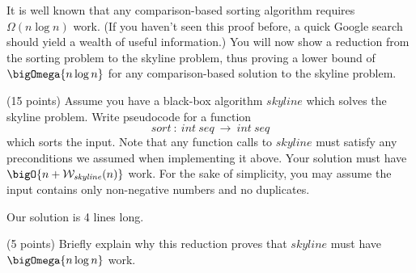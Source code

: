 It is well known that any comparison-based sorting algorithm requires
$\Omega(n \log n)$ work. (If you haven't seen this
proof before, a quick Google search should yield a wealth of useful
information.) You will now show a reduction from the sorting problem
to the skyline problem, thus proving a lower bound of $\bigOmega{n \log n}$
for any comparison-based solution to the skyline problem.


\begin{task}[10]
(15 points)
Assume you have a black-box algorithm $\mathit{skyline}$ which solves the
skyline problem. Write pseudocode for a function
\[
  \mathit{sort}~:~int~seq~\to~int~seq
\]
which sorts the input. Note that any function calls to $\mathit{skyline}$ must
satisfy any preconditions we assumed when implementing it above.
Your solution must have $\bigO {n + \mathcal{W}_\mathit{skyline}(n)}$ work.
For the sake of simplicity, you may assume the input contains only non-negative
numbers and no duplicates.
\end{task}

\begin{note}
Our solution is 4 lines long.
\end{note}

\begin{task}[11]
(5 points)
Briefly explain why this reduction proves that $\mathit{skyline}$ must have
$\bigOmega{n \log n}$ work.
\end{task}
